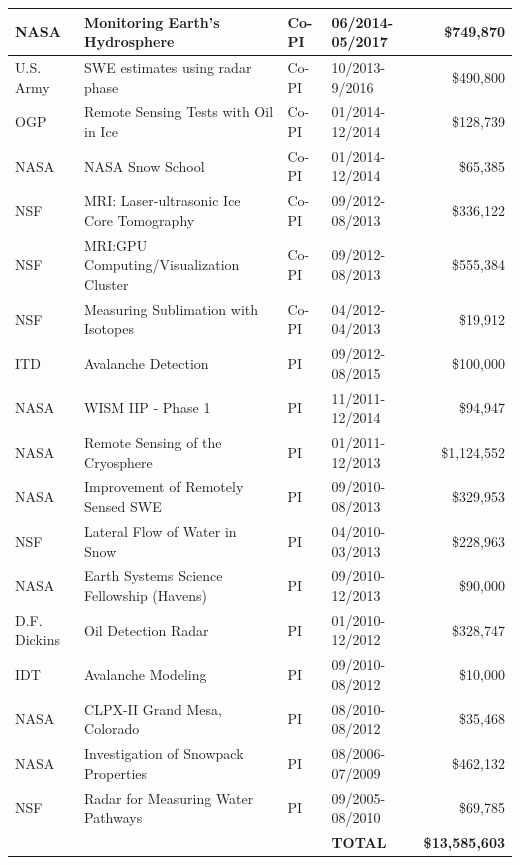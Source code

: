 \documentclass[11pt]{article}
\begin{document}
\begin{table}[!htbp]
\begin{tabular}{|l|l|l|l|r|}
NASA & Monitoring Earth's Hydrosphere & Co-PI & 06/2014-05/2017 &  \$749,870  \\ \hline
U.S. Army & SWE estimates using radar phase & Co-PI & 10/2013- 9/2016 & \$490,800 \\ \hline
OGP & Remote Sensing Tests with Oil in Ice & Co-PI & 01/2014-12/2014 & \$128,739 \\ \hline
NASA & NASA Snow School & Co-PI & 01/2014-12/2014 & \$65,385 \\ \hline
NSF & MRI: Laser-ultrasonic Ice Core Tomography & Co-PI & 09/2012-08/2013 & \$336,122 \\ \hline
NSF & MRI:GPU Computing/Visualization Cluster & Co-PI & 09/2012-08/2013 & \$555,384 \\ \hline
NSF & Measuring Sublimation with Isotopes & Co-PI & 04/2012-04/2013 & \$19,912 \\ \hline
ITD & Avalanche Detection & PI & 09/2012-08/2015 & \$100,000 \\ \hline
NASA & WISM IIP - Phase 1 & PI & 11/2011-12/2014 & \$94,947 \\ \hline
NASA & Remote Sensing of the Cryosphere & PI & 01/2011-12/2013 & \$1,124,552 \\ \hline
NASA & Improvement of Remotely Sensed SWE & PI & 09/2010-08/2013 & \$329,953 \\ \hline
NSF & Lateral Flow of Water in Snow & PI & 04/2010-03/2013 & \$228,963 \\ \hline
NASA & Earth Systems Science Fellowship (Havens) & PI & 09/2010-12/2013 & \$90,000 \\ \hline
D.F. Dickins & Oil Detection Radar & PI & 01/2010-12/2012 & \$328,747 \\ \hline
IDT & Avalanche Modeling & PI & 09/2010-08/2012 & \$10,000 \\ \hline
NASA & CLPX-II Grand Mesa, Colorado & PI & 08/2010-08/2012 & \$35,468 \\ \hline
NASA & Investigation of Snowpack Properties & PI & 08/2006-07/2009 & \$462,132 \\ \hline
NSF & Radar for Measuring Water Pathways & PI & 09/2005-08/2010 & \$69,785 \\ \hline
& &  & \textbf{TOTAL} & \textbf{\$13,585,603} \\ \hline
\end{tabular} 
\end{table}

\clearpage
\end{document}
